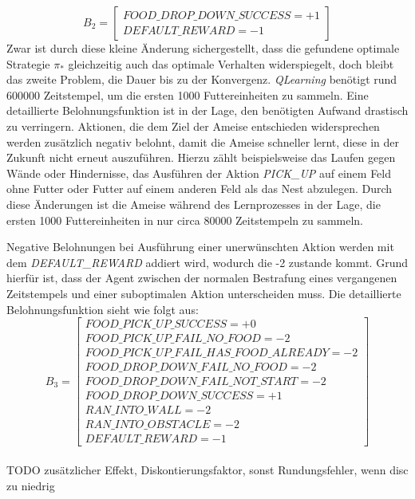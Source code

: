 \begin{equation}
    B_{2} =  \begin{bmatrix} 
        FOOD\_DROP\_DOWN\_SUCCESS = +1\\
        DEFAULT\_REWARD = -1          
 \end{bmatrix}
\end{equation}
Zwar ist durch diese kleine Änderung sichergestellt, dass die gefundene optimale Strategie $\pi_*$ gleichzeitig auch das optimale Verhalten widerspiegelt, doch bleibt das zweite Problem, die Dauer bis zu der Konvergenz. \textit{QLearning} benötigt rund $600000$ Zeitstempel, um die ersten 1000 Futtereinheiten zu sammeln. Eine detaillierte Belohnungsfunktion ist in der Lage, den benötigten Aufwand drastisch zu verringern. Aktionen, die dem Ziel der Ameise entschieden widersprechen werden zusätzlich negativ belohnt, damit die Ameise schneller lernt, diese in der Zukunft nicht erneut auszuführen. Hierzu zählt beispielsweise das Laufen gegen Wände oder Hindernisse, das Ausführen der Aktion \textit{PICK\_UP} auf einem Feld ohne Futter oder Futter auf einem anderen Feld als das Nest abzulegen. Durch diese Änderungen ist die Ameise während des Lernprozesses in der Lage, die ersten 1000 Futtereinheiten in nur circa $80000$ Zeitstempeln zu sammeln. 
\par
Negative Belohnungen bei Ausführung einer unerwünschten Aktion werden mit dem \textit{DEFAULT\_REWARD} addiert wird, wodurch die -2 zustande kommt. Grund hierfür ist, dass der Agent zwischen der normalen \glqq Bestrafung\grqq{} eines vergangenen Zeitstempels und einer suboptimalen Aktion unterscheiden muss. Die detaillierte Belohnungsfunktion sieht wie folgt aus:
\begin{equation}
    B_{3} =  \begin{bmatrix} 
        FOOD\_PICK\_UP\_SUCCESS = +0\\
        FOOD\_PICK\_UP\_FAIL\_NO\_FOOD = -2 \\
        FOOD\_PICK\_UP\_FAIL\_HAS\_FOOD\_ALREADY = -2\\
        FOOD\_DROP\_DOWN\_FAIL\_NO\_FOOD = -2 \\
        FOOD\_DROP\_DOWN\_FAIL\_NOT\_START = -2 \\
        FOOD\_DROP\_DOWN\_SUCCESS = +1\\
        RAN\_INTO\_WALL = -2\\
        RAN\_INTO\_OBSTACLE = -2 \\
        DEFAULT\_REWARD = -1                  
 \end{bmatrix}
\end{equation}
\\ TODO zusätzlicher Effekt, Diskontierungsfaktor, sonst Rundungsfehler, wenn disc zu niedrig